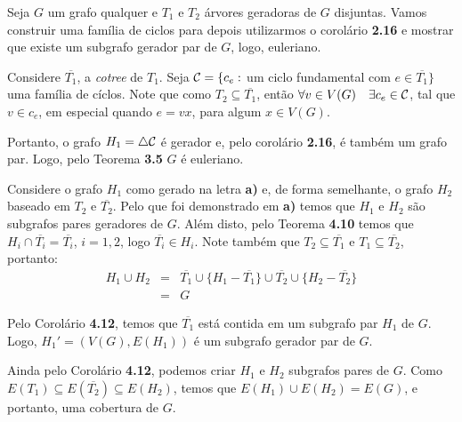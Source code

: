 
 Seja $G$ um grafo qualquer e $T_1$ e $T_2$ árvores geradoras de $G$ disjuntas. Vamos construir uma família de ciclos para depois utilizarmos o corolário {\bf 2.16} e mostrar que existe um subgrafo gerador par de $G$, logo, euleriano.

Considere $\overline{T_1}$, a {\it cotree} de $T_1$.
%
Seja ${\cal C} = \{c_e:$ um ciclo fundamental com $e \in \overline{T_1}\}$ uma família de cíclos.
%
Note que como $T_2 \subseteq \overline{T_1}$, então $\forall v \in V(G)\quad \exists c_e \in {\cal C}$, tal que $v \in c_e$, em especial quando $e = vx$, para algum $x \in V(G)$.

Portanto, o grafo $H_1 = \bigtriangleup {\cal C}$ é gerador e, pelo corolário {\bf 2.16}, é também um grafo par.
%
Logo, pelo Teorema {\bf 3.5} $G$ é euleriano.
\fimprova

 Considere o grafo $H_1$ como gerado na letra {\bf a)} e, de forma semelhante, o grafo $H_2$ baseado em $T_2$ e $\overline{T_2}$.
%
Pelo que foi demonstrado em {\bf a)} temos que $H_1$ e $H_2$ são subgrafos pares geradores de $G$.%
Além disto, pelo Teorema {\bf 4.10} temos que $H_i \cap \overline{T_i} = \overline{T_i}$, $i = 1,2$, logo $\overline{T_i} \in H_i$.
%
Note também que $T_2 \subseteq \overline{T_1}$ e $T_1 \subseteq \overline{T_2}$, portanto: 
\begin{eqnarray}
	H_1 \cup H_2 &=& \overline{T_1} \cup \{H_1 - \overline{T_1}\} \cup \overline{T_2} \cup \{H_2 - \overline{T_2}\} \nonumber \\
		     &=& G \nonumber
\end{eqnarray}
\fimprova


 Pelo Corolário {\bf 4.12}, temos que $\overline {T_1}$ está contida em um subgrafo par $H_1$ de $G$.
%
Logo, $H_1' = (V(G), E(H_1))$ é um subgrafo gerador par de $G$.
\fimprova

 Ainda pelo Corolário {\bf 4.12}, podemos criar $H_1$ e $H_2$ subgrafos pares de $G$.
%
Como $E(T_1) \subseteq E(\overline{T_2}) \subseteq E(H_2)$, temos que $E(H_1) \cup E(H_2) = E(G)$, e portanto, uma cobertura de $G$.
\fimprova

